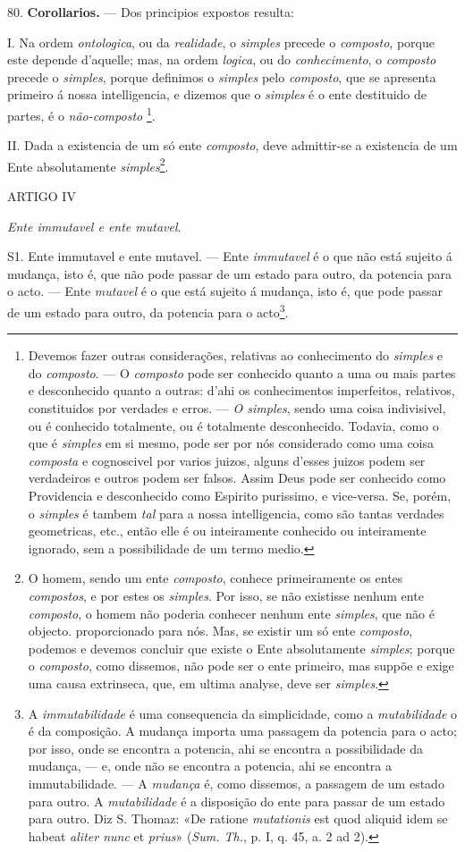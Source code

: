 80. \textbf{Corollarios.} --- Dos principios expostos resulta:

I. Na ordem \emph{ontologica}, ou da \emph{realidade}, o \emph{simples} precede o \emph{composto}, porque este depende d'aquelle; mas, na ordem \emph{logica}, ou do \emph{conhecimento}, o \emph{composto} precede o \emph{simples}, porque definimos o \emph{simples} pelo \emph{composto}, que se apresenta primeiro á nossa intelligencia, e dizemos que o \emph{simples} é o ente destituido de partes, é o \emph{não-composto} \footnote{Devemos fazer outras considerações, relativas ao conhecimento do \emph{simples} e do \emph{composto}. --- O \emph{composto} pode ser conhecido quanto a uma ou mais partes e desconhecido quanto a outras: d'ahi os conhecimentos imperfeitos, relativos, constituidos por verdades e erros. --- \emph{O simples}, sendo uma coisa indivisivel, ou é conhecido totalmente, ou é totalmente desconhecido. Todavia, como o que é \emph{simples} em si mesmo, pode ser por nós considerado como uma coisa \emph{composta} e cognoscivel por varios juizos, alguns d'esses juizos podem ser verdadeiros e outros podem ser falsos. Assim Deus pode ser conhecido como Providencia e desconhecido como Espirito purissimo, e vice-versa. Se, porém, o \emph{simples} é tambem \emph{tal} para a nossa intelligencia, como são tantas verdades geometricas, etc., então elle é ou inteiramente conhecido ou inteiramente ignorado, sem a possibilidade de um termo medio.}.

 II. Dada a existencia de um só ente \emph{composto}, deve admittir-se a existencia de um Ente absolutamente \emph{simples}\footnote{O homem, sendo um ente \emph{composto}, conhece primeiramente os entes \emph{compostos}, e por estes os \emph{simples}. Por isso, se não existisse nenhum ente \emph{composto}, o homem não poderia conhecer nenhum ente \emph{simples}, que não é objecto. proporcionado para nós. Mas, se existir um só ente \emph{composto}, podemos e devemos concluir que existe o Ente absolutamente \emph{simples}; porque o \emph{composto}, como dissemos, não pode ser o ente primeiro, mas suppõe e exige uma causa extrinseca, que, em ultima analyse, deve ser \emph{simples}.}.

ARTIGO IV

\emph{Ente immutavel e ente mutavel}.

S1. Ente immutavel e ente mutavel. --- Ente \emph{immutavel} é o que não está sujeito á mudança, isto é, que não pode passar de um estado para outro, da potencia para o acto. --- Ente \emph{mutavel} é o que está sujeito á mudança, isto é, que pode passar de um estado para outro, da potencia para o acto\footnote{A \emph{immutabilidade} é uma consequencia da simplicidade, como a \emph{mutabilidade} o é da composição. A mudança importa uma passagem da potencia para o acto; por isso, onde se encontra a potencia, ahi se encontra a possibilidade da mudança, --- e, onde não se encontra a potencia, ahi se encontra a immutabilidade. --- A \emph{mudança} é, como dissemos, a passagem de um estado para outro. A \emph{mutabilidade} é a disposição do ente para passar de um estado para outro. Diz S. Thomaz: «De ratione \emph{mutationis} est quod aliquid idem se habeat \emph{aliter nunc} et \emph{prius}» (\emph{Sum. Th.}, p. I, q. 45, a. 2 ad 2).}.

